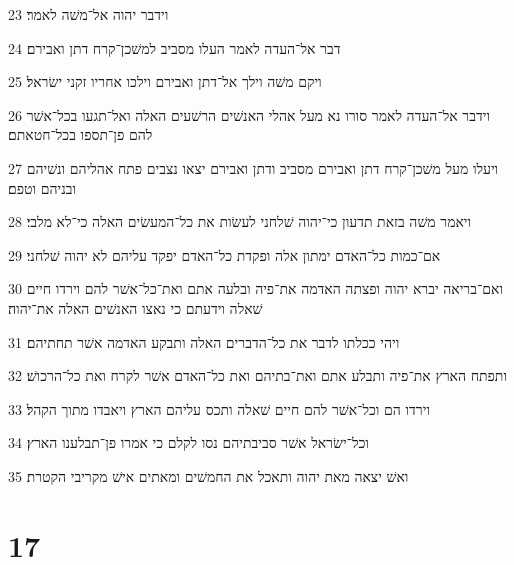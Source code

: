 \par 23 וידבר יהוה אל־משׁה לאמר׃
\par 24 דבר אל־העדה לאמר העלו מסביב למשׁכן־קרח דתן ואבירם׃
\par 25 ויקם משׁה וילך אל־דתן ואבירם וילכו אחריו זקני ישׂראל׃
\par 26 וידבר אל־העדה לאמר סורו נא מעל אהלי האנשׁים הרשׁעים האלה ואל־תגעו בכל־אשׁר להם פן־תספו בכל־חטאתם׃
\par 27 ויעלו מעל משׁכן־קרח דתן ואבירם מסביב ודתן ואבירם יצאו נצבים פתח אהליהם ונשׁיהם ובניהם וטפם׃
\par 28 ויאמר משׁה בזאת תדעון כי־יהוה שׁלחני לעשׂות את כל־המעשׂים האלה כי־לא מלבי׃
\par 29 אם־כמות כל־האדם ימתון אלה ופקדת כל־האדם יפקד עליהם לא יהוה שׁלחני׃
\par 30 ואם־בריאה יברא יהוה ופצתה האדמה את־פיה ובלעה אתם ואת־כל־אשׁר להם וירדו חיים שׁאלה וידעתם כי נאצו האנשׁים האלה את־יהוה׃
\par 31 ויהי ככלתו לדבר את כל־הדברים האלה ותבקע האדמה אשׁר תחתיהם׃
\par 32 ותפתח הארץ את־פיה ותבלע אתם ואת־בתיהם ואת כל־האדם אשׁר לקרח ואת כל־הרכושׁ׃
\par 33 וירדו הם וכל־אשׁר להם חיים שׁאלה ותכס עליהם הארץ ויאבדו מתוך הקהל׃
\par 34 וכל־ישׂראל אשׁר סביבתיהם נסו לקלם כי אמרו פן־תבלענו הארץ׃
\par 35 ואשׁ יצאה מאת יהוה ותאכל את החמשׁים ומאתים אישׁ מקריבי הקטרת׃

\chapter{17}

